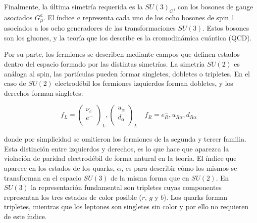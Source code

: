 Finalmente, la última simetría requerida es la $SU(3)_C$, con los bosones de gauge asociados $G_{\mu}^{a}$. El índice $a$ representa cada uno de los ocho bosones de spin 1 asociados a los ocho generadores de las transformaciones $SU(3)$. Estos bosones son los gluones, y la teoría que los describe es la cromodinámica cuántica (QCD).

Por su parte, los fermiones se describen mediante campos que definen estados dentro del espacio formado por las distintas simetrías. La simetría $SU(2)$ es análoga al spin, 
las partículas pueden formar singletes, dobletes o tripletes. %
En el caso de $SU(2)$ electrodébil los fermiones izquierdos forman dobletes, y los derechos forman singletes:

\begin{equation}
	f_L = 
	\begin{pmatrix}
	\nu_{e} \\
	e^{-} \\
	\end{pmatrix}_{L},
	\begin{pmatrix}
	u_\alpha \\
	d_\alpha \\
	\end{pmatrix}_{L}
	\quad
	f_R = e^{-}_{R},u_{R\alpha},d_{R\alpha}
\end{equation}

\noindent
donde por simplicidad se omitieron los fermiones de la segunda y tercer familia.
Esta distinción entre izquierdos y derechos, es lo que hace que aparezca la violación de paridad electrodébil de forma natural en la teoría. El índice que aparece en los estados de los quarks, $\alpha$, es para describir cómo los mismos se transforman en el espacio $SU(3)$ de la misma forma que en $SU(2)$. En $SU(3)$ la representación fundamental son tripletes cuyas componentes representan los tres estados de color posible ($r$, $g$ y $b$). Los quarks forman tripletes,  mientras que los leptones son singletes sin color y por ello no requieren de este índice.


